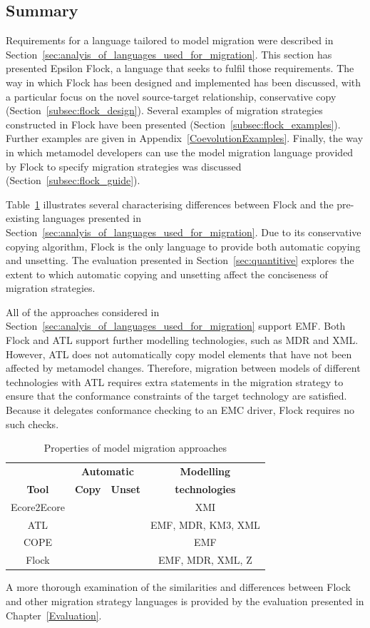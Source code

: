 \subsection{Summary}
Requirements for a language tailored to model migration were described in Section~\ref{sec:analyis_of_languages_used_for_migration}. This section has presented Epsilon Flock, a language that seeks to fulfil those requirements. The way in which Flock has been designed and implemented has been discussed, with a particular focus on the novel source-target relationship, conservative copy (Section~\ref{subsec:flock_design}). Several examples of migration strategies constructed in Flock have been presented (Section~\ref{subsec:flock_examples}). Further examples are given in Appendix~\ref{CoevolutionExamples}. Finally, the way in which metamodel developers can use the model migration language provided by Flock to specify migration strategies was discussed (Section~\ref{subsec:flock_guide}).

Table~\ref{tab:differences} illustrates several characterising differences between Flock and the pre-existing languages presented in Section~\ref{sec:analyis_of_languages_used_for_migration}. Due to its conservative copying algorithm, Flock is the only language to provide both automatic copying and unsetting. The evaluation presented in Section~\ref{sec:quantitive} explores the extent to which automatic copying and unsetting affect the conciseness of migration strategies.

All of the approaches considered in Section~\ref{sec:analyis_of_languages_used_for_migration} support EMF. Both Flock and ATL support further modelling technologies, such as MDR and XML. However, ATL does not automatically copy model elements that have not been affected by metamodel changes. Therefore, migration between models of different technologies with ATL requires extra statements in the migration strategy to ensure that the conformance constraints of the target technology are satisfied. Because it delegates conformance checking to an EMC driver, Flock requires no such checks.

\begin{table}[tbp]
	\centering
	\begin{tabular}{|c|c|c|c|}
		\hline
		             & \multicolumn{2}{c|}{\textbf{Automatic}} & \textbf{Modelling} \\
		\textbf{Tool}& \textbf{Copy} & \textbf{Unset}          & \textbf{technologies} \\
		\hline
		Ecore2Ecore  & \tick             & \cross              & XMI                    \\
		\hline
		ATL          & \cross            & \tick               & EMF, MDR, KM3, XML     \\
		\hline
		COPE         & \tick             & \cross              & EMF                    \\
		\hline
		Flock        & \tick             & \tick               & EMF, MDR, XML, Z       \\
		\hline
	\end{tabular}
	\caption{Properties of model migration approaches}
	\label{tab:differences}
\end{table}

A more thorough examination of the similarities and differences between Flock and other migration strategy languages is provided by the evaluation presented in Chapter~\ref{Evaluation}.
